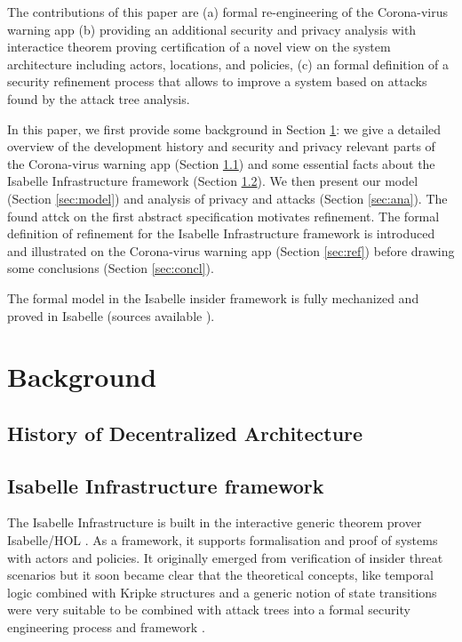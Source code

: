 \documentclass{llncs}
\newcommand{\TODO}[1]{\textcolor{red}{\textbf{[TODO:#1]}}}
\begin{document}
The contributions of this paper are (a) formal re-engineering of the Corona-virus warning app
(b) providing an additional security and privacy analysis with interactice theorem proving
certification of a novel view on the system architecture including actors, locations, and policies,
(c) an formal definition of a security refinement process that allows to improve a system
based on attacks found by the attack tree analysis.


In this paper, we first provide some background in Section \ref{sec:background}:
we give a detailed overview of the development history and security and privacy
relevant parts of the Corona-virus warning app (Section \ref{sec:history})
and some essential facts about the Isabelle Infrastructure framework
(Section \ref{sec:isainf}).
We then present our model (Section \ref{sec:model}) and analysis of privacy and
attacks (Section \ref{sec:ana}). The found attck on the first abstract specification
motivates refinement. The formal definition of refinement for the Isabelle Infrastructure
framework is introduced and illustrated on the Corona-virus warning app (Section \ref{sec:ref})
before drawing some conclusions (Section \ref{sec:concl}).

The formal model in the Isabelle insider framework is fully mechanized and proved in
Isabelle (sources available \cite{kam:18smc}). 

\section{Background}
\label{sec:background}

\subsection{History of Decentralized Architecture}
\label{sec:history}

\subsection{Isabelle Infrastructure framework}
\label{sec:isainf}
The Isabelle Infrastructure is built in the interactive generic theorem prover
Isabelle/HOL \cite{npw:02}. As a framework, it supports formalisation and proof of
systems with actors and policies. It originally emerged from verification of insider 
threat scenarios but it soon became clear that the theoretical concepts, like temporal
logic combined with Kripke structures and a generic notion of state transitions were
very suitable to be combined with attack trees into a formal security engineering process
\cite{suc:16} and framework \cite{kam:19a}.
\end{document}

